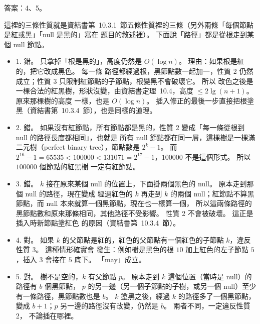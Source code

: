 \begin{pastsoln}
答案：4、5。

這裡的三條性質就是資結書第~10.3.1~節五條性質裡的三條（另外兩條「每個節點是紅或黑」「null 是黑的」寫在
題目的敘述裡）。 下面說「路徑」都是從根走到某個 null 節點。

\begin{itemize}
\item 1. 錯。 只拿掉「根是黑的」，高度仍然是 $O(\log n)$。 理由：如果根是紅的，把它改成黑色。 每一條
路徑都經過根，黑節點數一起加一，性質 2 仍然成立；性質 3 只限制紅節點的子節點，根變黑不會破壞它。 所以
改色之後是一棵合法的紅黑樹，形狀沒變，由資結書定理~10.4，高度 $\le 2\lg(n + 1)$。 原來那棵樹的高度
一樣，也是 $O(\log n)$。 插入修正的最後一步直接把根塗黑（資結書第~10.3.4~節），也是同樣的道理。
\item 2. 錯。 如果沒有紅節點，所有節點都是黑的，性質 2 變成「每一條從根到 null 的路徑長度都相同」，也就是
所有 null 節點都在同一層，這棵樹是一棵滿二元樹（perfect binary tree），節點數是 $2^k - 1$。 而
$2^{16} - 1 = 65535 < 100000 < 131071 = 2^{17} - 1$，$100000$ 不是這個形式。 所以 $100000$ 個節點的紅黑樹
一定有紅節點。
\item 3. 錯。 $k$ 接在原來某個 null 的位置上，下面掛兩個黑色的 null。 原本走到那個 null 的路徑，現在變成
經過紅色的 $k$ 再走到 $k$ 的兩個 null；紅節點不算黑節點，而 null 本來就算一個黑節點，現在也一樣算一個，
所以這兩條路徑的黑節點數和原來那條相同，其他路徑不受影響。 性質 2 不會被破壞。 這正是插入時新節點塗紅色
的原因（資結書第~10.3.4~節）。
\item 4. 對。 如果 $k$ 的父節點是紅的，紅色的父節點有一個紅色的子節點 $k$，違反性質 3。 這種情形確實會
發生：例如樹是黑色的根 $10$ 加上紅色的左子節點 $5$，插入 $3$ 會接在 $5$ 底下。 「may」成立。
\item 5. 對。 樹不是空的，$k$ 有父節點 $p$。 原本走到 $k$ 這個位置（當時是 null）的路徑有 $b$ 個黑節點，
$p$ 的另一邊（另一個子節點的子樹，或另一個 null）至少有一條路徑，黑節點數也是 $b$。 $k$ 塗黑之後，經過
$k$ 的路徑多了一個黑節點，變成 $b + 1$；$p$ 另一邊的路徑沒有改變，仍然是 $b$。 兩者不同，一定違反性質 2，
不論插在哪裡。
\end{itemize}
\end{pastsoln}
